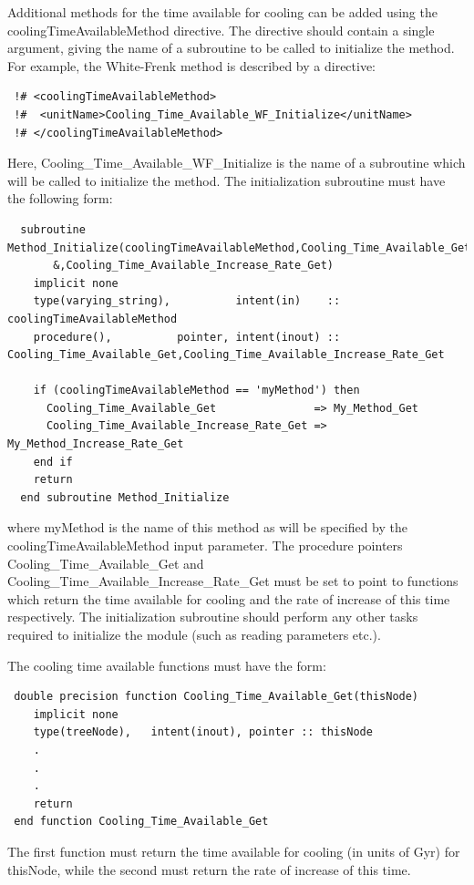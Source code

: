 Additional methods for the time available for cooling can be added using the {\normalfont \ttfamily coolingTimeAvailableMethod} directive. The directive should contain a single argument, giving the name of a subroutine to be called to initialize the method. For example, the {\normalfont \ttfamily White-Frenk} method is described by a directive:
\begin{verbatim}
 !# <coolingTimeAvailableMethod>
 !#  <unitName>Cooling_Time_Available_WF_Initialize</unitName>
 !# </coolingTimeAvailableMethod>
\end{verbatim}
Here, {\normalfont \ttfamily Cooling\_Time\_Available\_WF\_Initialize} is the name of a subroutine which will be called to initialize the method. The initialization subroutine must have the following form:
\begin{verbatim}
  subroutine Method_Initialize(coolingTimeAvailableMethod,Cooling_Time_Available_Get&
       &,Cooling_Time_Available_Increase_Rate_Get)
    implicit none
    type(varying_string),          intent(in)    :: coolingTimeAvailableMethod
    procedure(),          pointer, intent(inout) :: Cooling_Time_Available_Get,Cooling_Time_Available_Increase_Rate_Get
    
    if (coolingTimeAvailableMethod == 'myMethod') then
      Cooling_Time_Available_Get               => My_Method_Get
      Cooling_Time_Available_Increase_Rate_Get => My_Method_Increase_Rate_Get
    end if
    return
  end subroutine Method_Initialize
\end{verbatim}
where {\normalfont \ttfamily myMethod} is the name of this method as will be specified by the {\normalfont \ttfamily coolingTimeAvailableMethod} input parameter. The procedure pointers {\normalfont \ttfamily Cooling\_Time\_Available\_Get} and {\normalfont \ttfamily Cooling\_Time\_Available\_Increase\_Rate\_Get} must be set to point to functions which return the time available for cooling and the rate of increase of this time respectively. The initialization subroutine should perform any other tasks required to initialize the module (such as reading parameters etc.).

The cooling time available functions must have the form:
\begin{verbatim}
 double precision function Cooling_Time_Available_Get(thisNode)
    implicit none
    type(treeNode),   intent(inout), pointer :: thisNode
    .
    .
    .
    return
 end function Cooling_Time_Available_Get
\end{verbatim}
The first function must return the time available for cooling (in units of Gyr) for {\normalfont \ttfamily thisNode}, while the second must return the rate of increase of this time. 

